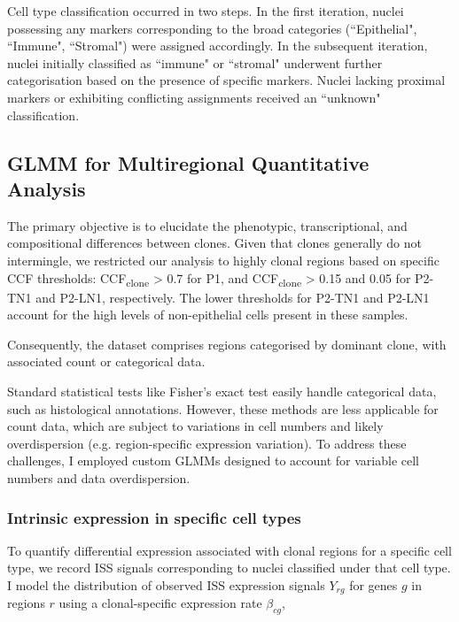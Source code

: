 Cell type classification occurred in two steps. In the first iteration, nuclei possessing any markers corresponding to the broad categories (``Epithelial", ``Immune", ``Stromal") were assigned accordingly. In the subsequent iteration, nuclei initially classified as ``immune" or ``stromal" underwent further categorisation based on the presence of specific markers. Nuclei lacking proximal markers or exhibiting conflicting assignments received an ``unknown" classification.

\subsection{\acs{GLMM} for Multiregional Quantitative Analysis}
\label{sec:modalities-glmm}

The primary objective is to elucidate the phenotypic, transcriptional, and compositional differences between clones. Given that clones generally do not intermingle, we restricted our analysis to highly clonal regions based on specific \ac{CCF} thresholds: CCF\textsubscript{clone} > 0.7 for P1, and CCF\textsubscript{clone} > 0.15 and 0.05 for P2-TN1 and P2-LN1, respectively. The lower thresholds for P2-TN1 and P2-LN1 account for the high levels of non-epithelial cells present in these samples.

Consequently, the dataset comprises regions categorised by dominant clone, with associated count or categorical data.

Standard statistical tests like Fisher's exact test easily handle categorical data, such as histological annotations. However, these methods are less applicable for count data, which are subject to variations in cell numbers and likely overdispersion (e.g. region-specific expression variation). To address these challenges, I employed custom \acfp{GLMM} designed to account for variable cell numbers and data overdispersion.

\subsubsection*{Intrinsic expression in specific cell types}

To quantify differential expression associated with clonal regions for a specific cell type, we record \ac{ISS} signals corresponding to nuclei classified under that cell type. I model the distribution of observed \ac{ISS} expression signals $Y_{rg}$ for genes $g$ in regions $r$ using a clonal-specific expression rate $\beta_{cg}$,

